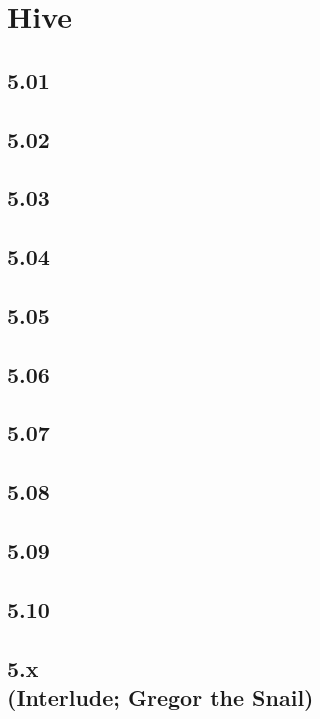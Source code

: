 \part{Hive}
\chapter{5.01}


\chapter{5.02}


\chapter{5.03}


\chapter{5.04}


\chapter{5.05}


\chapter{5.06}


\chapter{5.07}


\chapter{5.08}


\chapter{5.09}


\chapter{5.10}


\chapter[5.x (Interlude; Gregor the Snail)]{5.x\\(Interlude; Gregor the Snail)}

